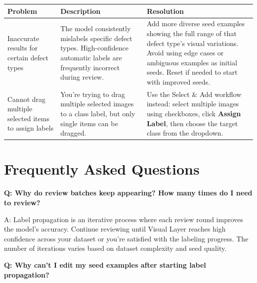 \documentclass[
  11pt,
  a4paper,
  11pt,
  oneside]{report}
\renewcommand{\toprule}{\hline}
\renewcommand{\midrule}{\hline}
\renewcommand{\bottomrule}{\hline}
\begin{document}
\begin{longtable}[]{@{}
  >{\raggedright\arraybackslash}p{}
  >{\raggedright\arraybackslash}p{}
  >{\raggedright\arraybackslash}p{}@{}}
\toprule\noalign{}
\begin{minipage}[b]{\linewidth}\raggedright
\textbf{Problem}
\end{minipage} & \begin{minipage}[b]{\linewidth}\raggedright
\textbf{Description}
\end{minipage} & \begin{minipage}[b]{\linewidth}\raggedright
\textbf{Resolution}
\end{minipage} \\
\midrule\noalign{}
\endhead
\bottomrule\noalign{}
\endlastfoot
Inaccurate results for certain defect types & The model consistently
mislabels specific defect types. High-confidence automatic labels are
frequently incorrect during review. & Add more diverse seed examples
showing the full range of that defect type's visual variations. Avoid
using edge cases or ambiguous examples as initial seeds. Reset if needed
to start with improved seeds. \\
Cannot drag multiple selected items to assign labels & You're trying to
drag multiple selected images to a class label, but only single items
can be dragged. & Use the Select \& Add workflow instead: select
multiple images using checkboxes, click \textbf{Assign Label}, then
choose the target class from the dropdown. \\
\end{longtable}

\chapter{Frequently Asked Questions}\label{frequently-asked-questions}

\textbf{Q: Why do review batches keep appearing? How many times do I
need to review?}

A: Label propagation is an iterative process where each review round
improves the model's accuracy. Continue reviewing until Visual Layer
reaches high confidence across your dataset or you're satisfied with the
labeling progress. The number of iterations varies based on dataset
complexity and seed quality.

\textbf{Q: Why can't I edit my seed examples after starting label
propagation?}
\end{document}

